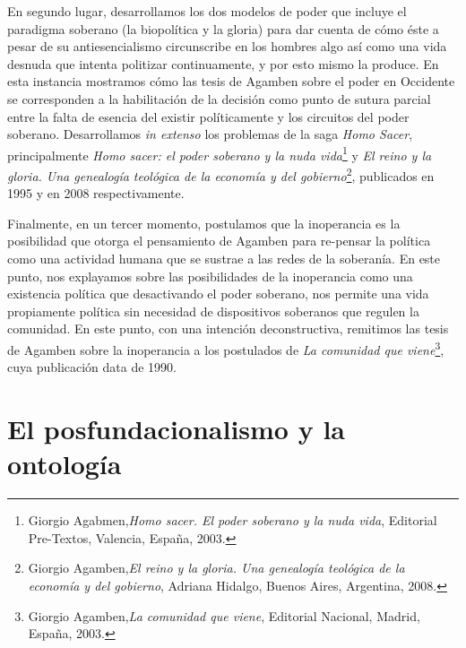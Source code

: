 En segundo lugar, desarrollamos los dos modelos de poder que incluye el
paradigma soberano (la biopolítica y la gloria) para dar cuenta de cómo
éste a pesar de su antiesencialismo circunscribe en los hombres algo así
como una vida desnuda que intenta politizar continuamente, y por esto
mismo la produce. En esta instancia mostramos cómo las tesis de Agamben
sobre el poder en Occidente se corresponden a la habilitación de la
decisión como punto de sutura parcial entre la falta de esencia del
existir políticamente y los circuitos del poder soberano. Desarrollamos
\emph{in extenso} los problemas de la saga \emph{Homo Sacer},
principalmente \emph{Homo sacer: el poder soberano y la nuda
vida}\footnote{Giorgio Agabmen,\emph{Homo sacer. El poder soberano y la
  nuda vida}, Editorial Pre-Textos, Valencia, España, 2003.} y \emph{El
reino y la gloria. Una genealogía teológica de la economía y del
gobierno}\footnote{Giorgio Agamben,\emph{El reino y la gloria. Una
  genealogía teológica de la economía y del gobierno}, Adriana Hidalgo,
  Buenos Aires, Argentina, 2008.}, publicados en 1995 y en 2008
respectivamente.

Finalmente, en un tercer momento, postulamos que la inoperancia es la
posibilidad que otorga el pensamiento de Agamben para re-pensar la
política como una actividad humana que se sustrae a las redes de la
soberanía. En este punto, nos explayamos sobre las posibilidades de la
inoperancia como una existencia política que desactivando el poder
soberano, nos permite una vida propiamente política sin necesidad de
dispositivos soberanos que regulen la comunidad. En este punto, con una
intención deconstructiva, remitimos las tesis de Agamben sobre la
inoperancia a los postulados de \emph{La comunidad que
viene}\footnote{Giorgio Agamben,\emph{La comunidad que viene}, Editorial
  Nacional, Madrid, España, 2003.}, cuya publicación data de 1990.

\section{El posfundacionalismo y la ontología}

